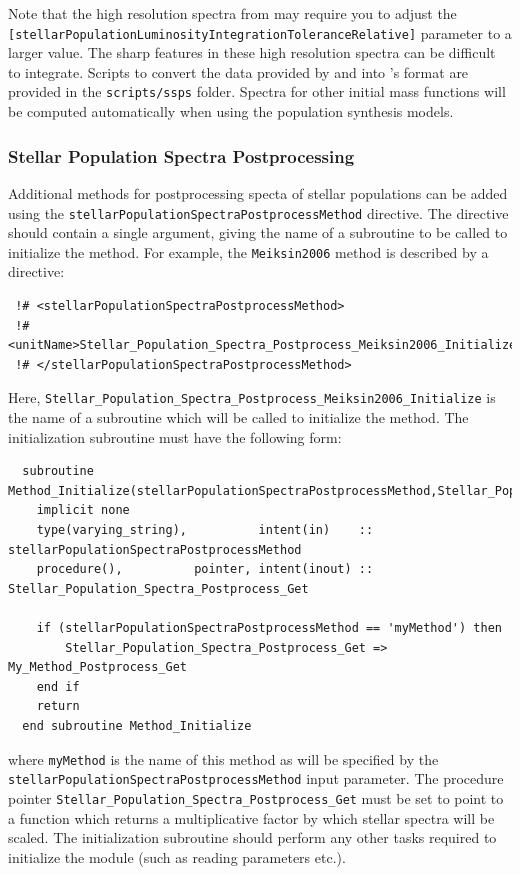 Note that the high resolution spectra from \cite{bruzual_stellar_2003} may require you to adjust the {\tt [stellarPopulationLuminosityIntegrationToleranceRelative]} parameter to a larger value. The sharp features in these high resolution spectra can be difficult to integrate. Scripts to convert the data provided by \cite{maraston_evolutionary_2005} and \cite{bruzual_stellar_2003} into \glc's format are provided in the {\tt scripts/ssps} folder. Spectra for other initial mass functions will be computed automatically when using the \cite{conroy_propagation_2009} population synthesis models.

\subsubsection{Stellar Population Spectra Postprocessing}

Additional methods for postprocessing specta of stellar populations can be added using the {\tt stellarPopulationSpectraPostprocessMethod} directive. The directive should contain a single argument, giving the name of a subroutine to be called to initialize the method. For example, the {\tt Meiksin2006} method is described by a directive:
\begin{verbatim}
 !# <stellarPopulationSpectraPostprocessMethod>
 !#  <unitName>Stellar_Population_Spectra_Postprocess_Meiksin2006_Initialize</unitName>
 !# </stellarPopulationSpectraPostprocessMethod>
\end{verbatim}
Here, {\tt Stellar\_Population\_Spectra\_Postprocess\_Meiksin2006\_Initialize} is the name of a subroutine which will be called to initialize the method. The initialization subroutine must have the following form:
\begin{verbatim}
  subroutine Method_Initialize(stellarPopulationSpectraPostprocessMethod,Stellar_Population_Spectra_Postprocess_Get)
    implicit none
    type(varying_string),          intent(in)    :: stellarPopulationSpectraPostprocessMethod
    procedure(),          pointer, intent(inout) :: Stellar_Population_Spectra_Postprocess_Get
    
    if (stellarPopulationSpectraPostprocessMethod == 'myMethod') then
        Stellar_Population_Spectra_Postprocess_Get => My_Method_Postprocess_Get
    end if
    return
  end subroutine Method_Initialize
\end{verbatim}
where {\tt myMethod} is the name of this method as will be specified by the {\tt stellarPopulationSpectraPostprocessMethod} input parameter. The procedure pointer {\tt Stellar\_Population\_Spectra\_Postprocess\_Get} must be set to point to a function which returns a multiplicative factor by which stellar spectra will be scaled. The initialization subroutine should perform any other tasks required to initialize the module (such as reading parameters etc.).

